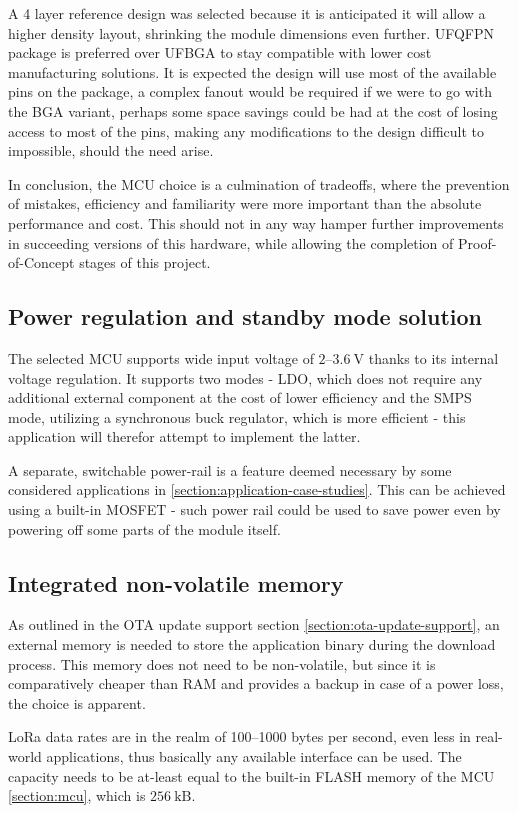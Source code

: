 A 4 layer reference design was selected because it is anticipated it will allow a higher density layout, shrinking the module dimensions even further. UFQFPN package is preferred over UFBGA to stay compatible with lower cost manufacturing solutions. It is expected the design will use most of the available pins on the package, a complex fanout would be required if we were to go with the BGA variant, perhaps some space savings could be had at the cost of losing access to most of the pins, making any modifications to the design difficult to impossible, should the need arise.

In conclusion, the MCU choice is a culmination of tradeoffs, where the prevention of mistakes, efficiency and familiarity were more important than the absolute performance and cost. This should not in any way hamper further improvements in succeeding versions of this hardware, while allowing the completion of Proof-of-Concept stages of this project. 

\subsection{Power regulation and standby mode solution}
The selected MCU supports wide input voltage of $2\text{--}3.6~\mathrm{V}$ thanks to its internal voltage regulation. It supports two modes - LDO, which does not require any additional external component at the cost of lower efficiency and the SMPS mode, utilizing a synchronous buck regulator, which is more efficient - this application will therefor attempt to implement the latter.

A separate, switchable power-rail is a feature deemed necessary by some considered applications in \ref{section:application-case-studies}. This can be achieved using a built-in MOSFET - such power rail could be used to save power even by powering off some parts of the module itself.

\subsection{Integrated non-volatile memory}
As outlined in the OTA update support section \ref{section:ota-update-support}, an external memory is needed to store the application binary during the download process. This memory does not need to be non-volatile, but since it is comparatively cheaper than RAM and provides a backup in case of a power loss, the choice is apparent.

LoRa data rates are in the realm of 100--1000 bytes per second, even less in real-world applications, thus basically any available interface can be used. The capacity needs to be at-least equal to the built-in FLASH memory of the MCU \ref{section:mcu}, which is $256~\mathrm{kB}$.

